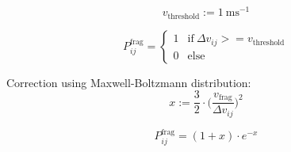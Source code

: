         
        
        \begin{equation}
            v_\text{threshold}:=\SI{1}{\meter\second^{-1}}
        \end{equation}
        
        \begin{equation}
            P^\text{frag}_{ij}
            =
            \begin{cases}
                1 & \text{if}\ \Delta v_{ij} >= v_\text{threshold}\\
                0 & \text{else}
            \end{cases}
        \end{equation}
        
        Correction using Maxwell-Boltzmann distribution:
        \begin{equation}
            x:=\frac{3}{2}\cdot\bigg(
                \frac{v_\text{frag}}{\Delta v_{ij}}
            \bigg)^2
        \end{equation}
        
        \begin{equation}
            P^\text{frag}_{ij}=(1+x)\cdot e^{-x}
        \end{equation}
        
        
        


